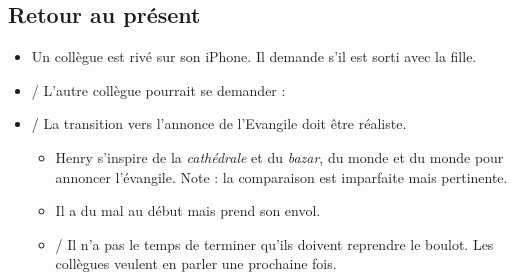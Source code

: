 \documentclass{article}
\begin{document}
	\subsection{Retour au présent}
	
		\begin{itemize}
		\item \humour{} Un collègue est rivé sur son iPhone. Il demande
		s'il est sorti avec la fille.
		\item \histoire{}/\evang{} L'autre collègue pourrait se demander :
		\item \evang{}/\drama{} La transition vers l'annonce de l'Evangile doit
		être réaliste.
			\begin{itemize}
			\item \histoire{} Henry s'inspire de la \emph{cathédrale} et du
			\emph{bazar}, du monde  et du monde  pour
			annoncer l'évangile. Note : la comparaison est imparfaite mais
			pertinente.
			\item \mes{} Il a du mal au début mais prend son envol.
			\item \mes{}/\histoire{} Il n'a pas le temps de terminer qu'ils 
			doivent reprendre le boulot. Les collègues veulent en parler une
			prochaine fois.
			\end{itemize}
		\end{itemize}
\end{document}

